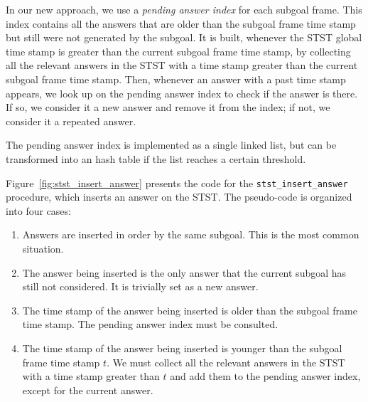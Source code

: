 In our new approach, we use a \textit{pending answer index} for each subgoal frame.
This index contains all the answers that are older than the subgoal frame time stamp
but still were not generated by the subgoal. It is built, whenever the STST
global time stamp is greater than the current subgoal frame time stamp, by
collecting all the relevant answers in the STST with a time stamp greater than
the current subgoal frame time stamp. Then, whenever an answer with a past time stamp appears,
we look up on the pending answer index to check if the answer is there. If so,
we consider it a new answer and remove it from the index; if not, we consider it a repeated answer.

The pending answer index is implemented as a single linked list, but can be transformed
into an hash table if the list reaches a certain threshold.

Figure~\ref{fig:stst_insert_answer} presents the code for the \texttt{stst\_insert\_answer} procedure,
which inserts an answer on the STST. The pseudo-code is organized into four cases:

\begin{enumerate}
   \item Answers are inserted in order by the same subgoal. This is the most common situation.
   \item The answer being inserted is the only answer that the current subgoal has still not considered.
   It is trivially set as a new answer.
   \item The time stamp of the answer being inserted is older than the subgoal frame time stamp.
   The pending answer index must be consulted.
   \item The time stamp of the answer being inserted is younger than the subgoal frame time stamp $t$.
   We must collect all the relevant answers in the STST with a time stamp greater than $t$
   and add them to the pending answer index, except for the current answer.
\end{enumerate}

